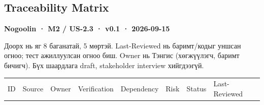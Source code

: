 \documentclass[
  11pt,
  a4paper,
]{article}
\begin{document}
\clearpage
\begin{landscape}
\section{Traceability Matrix}\label{doc5-traceability-matrix}

\textbf{Nogoolin · M2 / US-2.3 · v0.1 · 2026-09-15}

Доорх нь яг 8 баганатай, 5 мөртэй. Last-Reviewed нь баримт/кодыг уншсан
огноо; тест ажиллуулсан огноо биш. Owner нь Тэнгис (хөгжүүлэгч, баримт
бичигч). Бүх шаардлага draft, stakeholder interview хийгдээгүй.

\begin{longtable}[]{@{}
  >{\raggedright\arraybackslash}p{}
  >{\raggedright\arraybackslash}p{}
  >{\raggedright\arraybackslash}p{}
  >{\raggedright\arraybackslash}p{}
  >{\raggedright\arraybackslash}p{}
  >{\raggedright\arraybackslash}p{}
  >{\raggedright\arraybackslash}p{}
  >{\raggedright\arraybackslash}p{}@{}}
\toprule\noalign{}
\begin{minipage}[b]{\linewidth}\raggedright
ID
\end{minipage} & \begin{minipage}[b]{\linewidth}\raggedright
Source
\end{minipage} & \begin{minipage}[b]{\linewidth}\raggedright
Owner
\end{minipage} & \begin{minipage}[b]{\linewidth}\raggedright
Verification
\end{minipage} & \begin{minipage}[b]{\linewidth}\raggedright
Dependency
\end{minipage} & \begin{minipage}[b]{\linewidth}\raggedright
Risk
\end{minipage} & \begin{minipage}[b]{\linewidth}\raggedright
Status
\end{minipage} & \begin{minipage}[b]{\linewidth}\raggedright
Last-Reviewed
\end{minipage} \\

\end{longtable}
\end{landscape}
\end{document}
